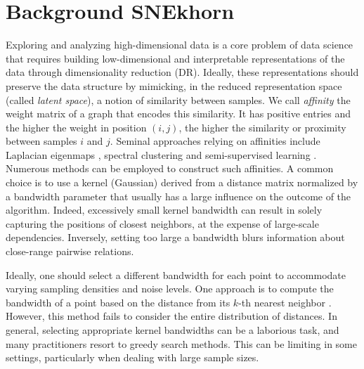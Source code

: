 \section{Background SNEkhorn}

Exploring and analyzing high-dimensional data is a core problem of data science that requires building low-dimensional and interpretable
representations of the data through dimensionality reduction (DR). Ideally, these representations should preserve the data structure by mimicking, in the reduced representation space (called \emph{latent space}), a notion of similarity between samples. 
We call \emph{affinity} the weight matrix of a graph that encodes this similarity. It has positive entries and the higher the weight in position $(i,j)$, the
higher the similarity or proximity between samples $i$ and $j$.
Seminal approaches relying on affinities include Laplacian
eigenmaps \citep{belkin2003laplacian}, spectral clustering
\citep{von2007tutorial} and semi-supervised learning \citep{zhou2003learning}. Numerous methods can be employed to construct such affinities. A common choice is to use a kernel (\eg Gaussian) derived from a distance matrix normalized by a bandwidth parameter that usually has a large influence on the outcome of the algorithm. 
Indeed, excessively small kernel bandwidth can result in %
solely capturing the positions of closest neighbors, at the expense of large-scale dependencies. Inversely, setting too large a bandwidth blurs information about close-range pairwise relations. 

Ideally, one should select a different bandwidth for each point to accommodate varying sampling densities and noise levels. One approach is to compute the bandwidth of a point based on the distance from its $k$-th nearest neighbor \cite{zelnik2004self}. However, this method fails to consider the entire distribution of distances.
In general, selecting appropriate kernel bandwidths can be a laborious task, and many practitioners resort to greedy search methods. This can be limiting in some settings, particularly when dealing with large sample sizes.

